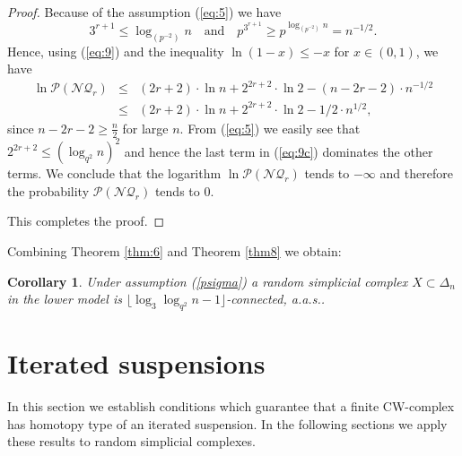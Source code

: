\documentclass[10pt,a4paper]{amsart}
\newtheorem{corollary}[lema]{Corollary}
\begin{document}
\begin{proof}
Because of the assumption (\ref{eq:5}) we have
$$
3^{r+1}\le \log_{(p^{-2})}n \quad \mbox{and}\quad p^{3^{r+1}} \ge p^{\log_{(p^{-2})}n} = n^{-1/2}.
$$
Hence, using (\ref{eq:9}) and the inequality $\ln (1-x)\le -x$ for $x\in (0,1)$, we have
\begin{eqnarray}\label{eq:9c}
\ln \mathcal P(\mathcal {NQ}_r) &\le & (2r+2)\cdot \ln n+ 2^{2r+2}\cdot \ln 2- (n-2r-2)\cdot n^{-1/2}\nonumber \\
&\le &(2r+2)\cdot \ln n+ 2^{2r+2}\cdot \ln 2- 1/2\cdot n^{1/2},
\end{eqnarray}
since $n-2r-2 \ge \frac{n}{2}$ for large $n$. From (\ref{eq:5}) we easily see that $2^{2r+2}\le (\log_{q^{2}}n)^2$ and hence the last term in (\ref{eq:9c}) dominates the other terms.
We conclude that the logarithm $\ln \mathcal P(\mathcal {NQ}_r)$ tends to $-\infty$ and therefore the probability 
$\mathcal P(\mathcal {NQ}_r)$ tends to $0$. 

This completes the proof. 
\end{proof}

Combining Theorem \ref{thm:6} and Theorem \ref{thm8} we obtain:

\begin{corollary}\label{cor:conn}
Under assumption (\ref{psigma}) a random simplicial complex $X\subset \Delta_n$ in the lower model is 
$\lfloor \log_3\log_{q^{2}} n -1\rfloor$-connected, a.a.s.. 
\end{corollary}

\section{Iterated suspensions}

In this section we establish conditions which guarantee that a finite  CW-complex has homotopy type of an iterated suspension. In the following sections we apply these results to random simplicial complexes. 
\end{document}
